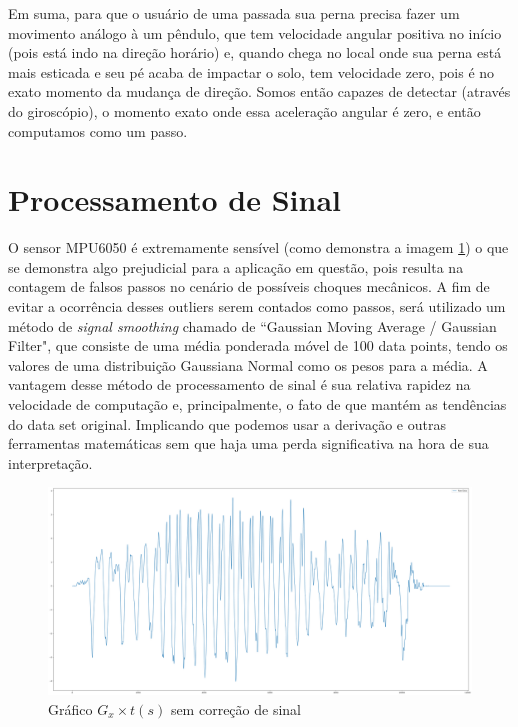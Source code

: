 \documentclass{article}
\begin{document}
            Em suma, para que o usuário de uma passada sua perna precisa fazer um movimento análogo à um
            pêndulo, que tem velocidade angular positiva no início (pois está indo na direção horário) e,
            quando chega no local onde sua perna está mais esticada e seu pé acaba de impactar o solo, tem
            velocidade zero, pois é no exato momento da mudança de direção. Somos então capazes de detectar
            (através do giroscópio), o momento exato onde essa aceleração angular é zero, e então computamos
            como um passo.
        \newpage


        \section{Processamento de Sinal}
            O sensor MPU6050 é extremamente sensível (como demonstra a imagem \ref{img:raw_plot}) o que se demonstra algo
            prejudicial para a aplicação em questão, pois resulta na contagem de falsos passos no cenário de
            possíveis choques mecânicos. A fim de evitar a ocorrência desses outliers serem contados como
            passos, será utilizado um método de \textit{signal smoothing} chamado de ``Gaussian Moving Average /
            Gaussian Filter", que consiste de uma média ponderada móvel de 100 data points, tendo os valores
            de uma distribuição Gaussiana Normal como os pesos para a média. A vantagem desse método de
            processamento de sinal é sua relativa rapidez na velocidade de computação e, principalmente, o
            fato de que mantém as tendências do data set original. Implicando que podemos usar a derivação e
            outras ferramentas matemáticas sem que haja uma perda significativa na hora de sua interpretação.
            
            \begin{figure}[h!]
                \centering
                \includegraphics[width=.8\textwidth]{img/Raw_Data.png} 
                \caption{Gráfico $G_x \times t(s)$ sem correção de sinal}
                \label{img:raw_plot} 
            \end{figure}
\end{document}

